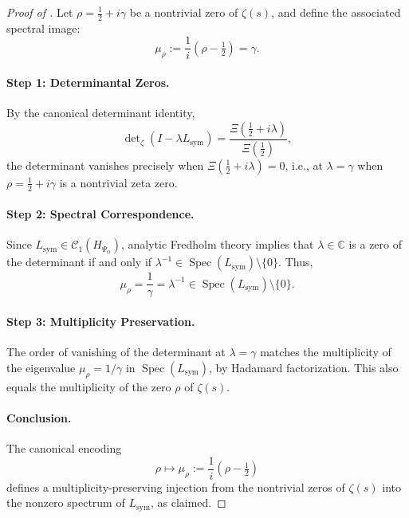 \begin{proof}[Proof of ]
Let \( \rho = \tfrac{1}{2} + i\gamma \) be a nontrivial zero of \( \zeta(s) \), and define the associated spectral image:
\[
\mu_\rho := \frac{1}{i}(\rho - \tfrac{1}{2}) = \gamma.
\]

\paragraph{Step 1: Determinantal Zeros.}
By the canonical determinant identity,
\[
\det\nolimits_\zeta(I - \lambda L_{\mathrm{sym}}) = \frac{\Xi(\tfrac{1}{2} + i\lambda)}{\Xi(\tfrac{1}{2})},
\]
the determinant vanishes precisely when \( \Xi(\tfrac{1}{2} + i\lambda) = 0 \), i.e., at \( \lambda = \gamma \) when \( \rho = \tfrac{1}{2} + i\gamma \) is a nontrivial zeta zero.

\paragraph{Step 2: Spectral Correspondence.}
Since \( L_{\mathrm{sym}} \in \mathcal{C}_1(H_{\Psi_\alpha}) \), analytic Fredholm theory implies that \( \lambda \in \mathbb{C} \) is a zero of the determinant if and only if \( \lambda^{-1} \in \operatorname{Spec}(L_{\mathrm{sym}}) \setminus \{0\} \). Thus,
\[
\mu_\rho = \frac{1}{\gamma} = \lambda^{-1} \in \operatorname{Spec}(L_{\mathrm{sym}}) \setminus \{0\}.
\]

\paragraph{Step 3: Multiplicity Preservation.}
The order of vanishing of the determinant at \( \lambda = \gamma \) matches the multiplicity of the eigenvalue \( \mu_\rho = 1/\gamma \) in \( \operatorname{Spec}(L_{\mathrm{sym}}) \), by Hadamard factorization. This also equals the multiplicity of the zero \( \rho \) of \( \zeta(s) \).

\paragraph{Conclusion.}
The canonical encoding
\[
\rho \mapsto \mu_\rho := \frac{1}{i}(\rho - \tfrac{1}{2})
\]
defines a multiplicity-preserving injection from the nontrivial zeros of \( \zeta(s) \) into the nonzero spectrum of \( L_{\mathrm{sym}} \), as claimed.
\end{proof}

